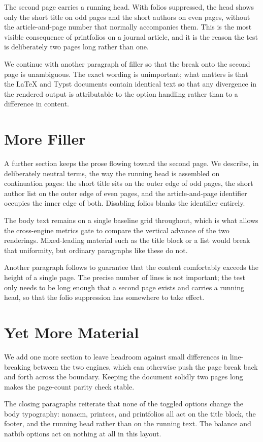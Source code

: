 \documentclass[acmsmall,nonacm,balance=false,natbib=false]{acmart}
\begin{document}
The second page carries a running head. With folios suppressed, the head shows
only the short title on odd pages and the short authors on even pages, without
the article-and-page number that normally accompanies them. This is the most
visible consequence of printfolios on a journal article, and it is the reason the
test is deliberately two pages long rather than one.

We continue with another paragraph of filler so that the break onto the second
page is unambiguous. The exact wording is unimportant; what matters is that the
LaTeX and Typst documents contain identical text so that any divergence in the
rendered output is attributable to the option handling rather than to a
difference in content.

\section{More Filler}
A further section keeps the prose flowing toward the second page. We describe, in
deliberately neutral terms, the way the running head is assembled on continuation
pages: the short title sits on the outer edge of odd pages, the short author list
on the outer edge of even pages, and the article-and-page identifier occupies the
inner edge of both. Disabling folios blanks the identifier entirely.

The body text remains on a single baseline grid throughout, which is what allows
the cross-engine metrics gate to compare the vertical advance of the two
renderings. Mixed-leading material such as the title block or a list would break
that uniformity, but ordinary paragraphs like these do not.

Another paragraph follows to guarantee that the content comfortably exceeds the
height of a single page. The precise number of lines is not important; the test
only needs to be long enough that a second page exists and carries a running
head, so that the folio suppression has somewhere to take effect.

\section{Yet More Material}
We add one more section to leave headroom against small differences in
line-breaking between the two engines, which can otherwise push the page break
back and forth across the boundary. Keeping the document solidly two pages long
makes the page-count parity check stable.

The closing paragraphs reiterate that none of the toggled options change the body
typography: nonacm, printccs, and printfolios all act on the title block, the
footer, and the running head rather than on the running text. The balance and
natbib options act on nothing at all in this layout.
\end{document}
